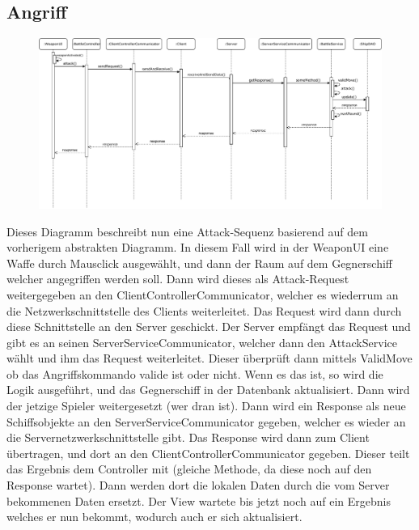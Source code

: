 \documentclass[fontsize=12pt,paper=a4,twoside]{scrartcl}
\begin{document}
\subsection{Angriff}

\begin{figure}[H]
\begin{center}
  \includegraphics[width=\linewidth]{UML/Sequenz-Attack.pdf}
\end{center}
\end{figure}

Dieses Diagramm beschreibt nun eine Attack-Sequenz basierend auf dem vorherigem abstrakten Diagramm. In diesem Fall wird in der WeaponUI eine Waffe durch Mausclick ausgewählt, und dann der Raum auf dem Gegnerschiff welcher angegriffen werden soll. Dann wird dieses als Attack-Request weitergegeben an den ClientControllerCommunicator, welcher es wiederrum an die Netzwerkschnittstelle des Clients weiterleitet. Das Request wird dann durch diese Schnittstelle an den Server geschickt. Der Server empfängt das Request und gibt es an seinen ServerServiceCommunicator, welcher dann den AttackService wählt und ihm das Request weiterleitet. Dieser überprüft dann mittels ValidMove ob das Angriffskommando valide ist oder nicht. Wenn es das ist, so wird die Logik ausgeführt, und das Gegnerschiff in der Datenbank aktualisiert. Dann wird der jetzige Spieler weitergesetzt (wer dran ist). Dann wird ein Response als neue Schiffsobjekte an den ServerServiceCommunicator gegeben, welcher es wieder an die Servernetzwerkschnittstelle gibt. Das Response wird dann zum Client übertragen, und dort an den ClientControllerCommunicator gegeben. Dieser teilt das Ergebnis dem Controller mit (gleiche Methode, da diese noch auf den Response wartet). Dann werden dort die lokalen Daten durch die vom Server bekommenen Daten ersetzt. Der View wartete bis jetzt noch auf ein Ergebnis welches er nun bekommt, wodurch auch er sich aktualisiert.
\end{document}
